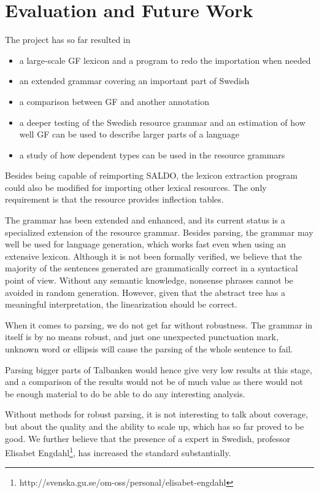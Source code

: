 \documentclass[10pt, a4paper]{article}
\begin{document}
\section{Evaluation and Future Work}
The project has so far resulted in
\begin{itemize}
\item a large-scale GF lexicon and a program to redo the importation when needed
\item an extended grammar covering an important part of Swedish
\item a comparison between GF and another annotation
\item a deeper testing of the Swedish resource grammar and an estimation
of how well GF can be used to describe larger parts of a language
\item a study of how dependent types can be used in the resource grammars
\end{itemize}

Besides being capable of reimporting SALDO, the lexicon extraction program could also
be modified for importing other lexical resources. The only requirement is that
the resource provides inflection tables.

The grammar has been extended and enhanced, and its current status is
a specialized extension of the resource grammar.
Besides parsing, the grammar may well be used for language generation,
which works fast even when using an extensive lexicon.
Although it is not been formally verified, we believe that the majority of the
sentences generated are grammatically correct in a syntactical point of view.
Without any semantic knowledge, nonsense phrases cannot be avoided in
random generation. However, given that the abstract tree has a meaningful
interpretation,
the linearization should be correct.

When it comes to parsing, we do not get far without robustness.
The grammar in itself is by no means robust, and just one 
unexpected punctuation mark, unknown word
or ellipsis will cause the parsing of the whole sentence to fail. 

Parsing bigger parts of Talbanken would hence give very low results at this stage, 
and a comparison of the results would not be of much value as
there would not be enough material
to do be able to do any interesting analysis.

Without methods for robust parsing, %
it is not interesting to talk about coverage, but about the quality and
the ability to scale up, which has so far proved to be good.
We further believe that the presence of a expert in Swedish, professor Elisabet
Engdahl\footnote{http://svenska.gu.se/om-oss/personal/elisabet-engdahl},
has increased the standard substantially.\\
\end{document}
